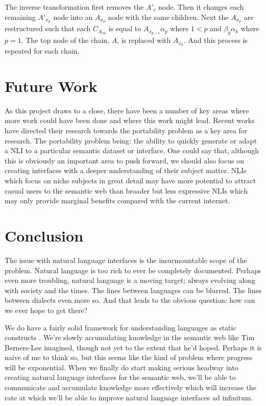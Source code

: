 \documentclass[11pt]{article}
\begin{document}
{The inverse transformation first removes the $A'_\epsilon$ node. Then it changes each remaining $A'_{x_p}$ node into an $A_{x_p}$ node
with the same children. Next the $A_{x_p}$ are restructured such that each $C_{A_{x p}}$
is equal to $A_{x_{p-1}} \alpha_p$ where $1 < p$ and $\beta_y \alpha_k$ where $p=1$. The top node of the chain, 
$A$, is replaced with $A_{x_k}$. And this process is repeated for each chain.

\section{Future Work}
As this project draws to a close, there have been a number of key areas where more work
could have been done and where this work might lead. 
Recent works have directed their research towards the portability problem as a key area 
for research. The portability problem being: the ability to quickly generate or adapt 
a NLI to a particular semantic dataset or interface. 
One could say that, although this is obviously
an important area to push forward, we should also focus on creating interfaces with a
deeper understanding of their subject matter. NLIs which focus on niche subjects in great
detail may have more potential to attract casual users to the semantic web than broader
but less expressive NLIs which may only provide marginal benefits compared with the 
current internet.

\section{Conclusion}
The issue with natural language interfaces is the insurmountable scope of the problem. 
Natural language is too rich to ever be completely documented. Perhaps even more troubling,
natural language is a moving target; always evolving along with society and the times.
The lines between languages can be blurred. The lines between dialects even more so.
And that leads to the obvious question: how can we ever hope to get there?

We do have a fairly solid framework for understanding languages as static constructs
\cite{chomsky}. We're slowly accumulating knowledge in the semantic web like 
Tim Berners-Lee imagined, though not yet to the extent that he'd hoped. Perhaps it is
naive of me to think so, but this seems like the kind of problem where progress
will be exponential. When we finally do start making serious headway into creating
natural language interfaces for the semantic web, we'll be able to communicate and
accumulate knowledge more effectively which will increase the rate at which we'll be
able to improve natural language interfaces ad infinitum.

}
\end{document}
